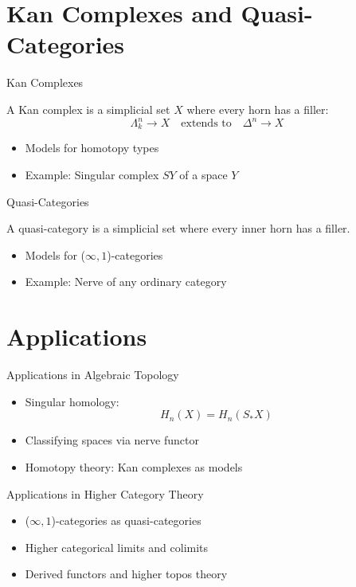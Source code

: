 \documentclass{beamer}
\begin{document}
\section{Kan Complexes and Quasi-Categories}

\begin{frame}{Kan Complexes}
  \begin{definition}
    A Kan complex is a simplicial set \(X\) where every horn has a filler:
    \[
    \Lambda^n_k \to X \quad \text{extends to} \quad \Delta^n \to X
    \]
  \end{definition}
  \begin{itemize}
    \item Models for homotopy types
    \item Example: Singular complex \(SY\) of a space \(Y\)
  \end{itemize}
\end{frame}

\begin{frame}{Quasi-Categories}
  \begin{definition}
    A quasi-category is a simplicial set where every inner horn has a filler.
  \end{definition}
  \begin{itemize}
    \item Models for (\(\infty, 1\))-categories
    \item Example: Nerve of any ordinary category
  \end{itemize}
\end{frame}

\section{Applications}

\begin{frame}{Applications in Algebraic Topology}
  \begin{itemize}
    \item Singular homology:
      \[
      H_n(X) = H_n(S_*X)
      \]
    \item Classifying spaces via nerve functor
    \item Homotopy theory: Kan complexes as models
  \end{itemize}
\end{frame}

\begin{frame}{Applications in Higher Category Theory}
  \begin{itemize}
    \item (\(\infty, 1\))-categories as quasi-categories
    \item Higher categorical limits and colimits
    \item Derived functors and higher topos theory
  \end{itemize}
\end{frame}
\end{document}
